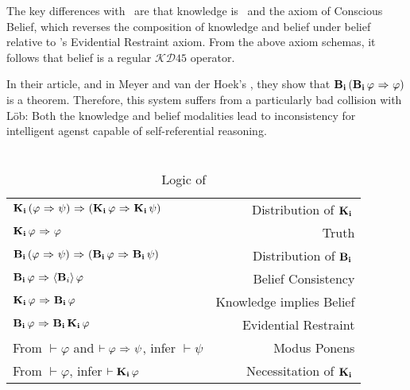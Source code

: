 The key differences with \DASL\ are that knowledge is \SFive\ and the axiom of Conscious Belief, which reverses the composition of knowledge and belief under belief relative to \DASL's Evidential Restraint axiom. From the above axiom schemas, it follows that belief is a regular $\mathcal{KD}45$ operator.

In their article, and in Meyer and van der Hoek's \cite{MeyerHoek}, they show that $\mathbf{B}_{\mathbf{i}}\,(\mathbf{B}_{\mathbf{i}}\,\varphi {\ \Rightarrow \ } \varphi)$ is a theorem. Therefore, this system suffers from a particularly bad collision with L\"ob: Both the knowledge and belief modalities lead to inconsistency for intelligent agenst capable of self-referential reasoning.
\section{\DASL}
\label{sec:crap}

\begin{table}[H]
	\begin{center}
		\begin{tabular}{| l r |}
			\hline
			$\mathbf{K}_{\mathbf{i}}\,(\varphi {\ \Rightarrow \ } \psi) {\ \Rightarrow \ } (\mathbf{K}_{\mathbf{i}}\,\varphi {\ \Rightarrow \ } \mathbf{K}_{\mathbf{i}}\,\psi)$ & Distribution of $\mathbf{K}_{\mathbf{i}}\,$ \\
			$\mathbf{K}_{\mathbf{i}}\,\varphi {\ \Rightarrow \ } \varphi$ & Truth \\
			$\mathbf{B}_{\mathbf{i}}\,(\varphi {\ \Rightarrow \ } \psi) {\ \Rightarrow \ } (\mathbf{B}_{\mathbf{i}}\,\varphi {\ \Rightarrow \ } \mathbf{B}_{\mathbf{i}}\,\psi)$ & Distribution of $\mathbf{B}_{\mathbf{i}}\,$\\
			$\mathbf{B}_{\mathbf{i}}\,\varphi {\ \Rightarrow \ } \langle \mathbf{B}_{i} \rangle\,\varphi$ & Belief Consistency \\
			$\mathbf{K}_{\mathbf{i}}\,\varphi {\ \Rightarrow \ } \mathbf{B}_{\mathbf{i}}\,\varphi$ & Knowledge implies Belief \\
			$\mathbf{B}_{\mathbf{i}}\,\varphi {\ \Rightarrow \ } \mathbf{B}_{\mathbf{i}}\,\mathbf{K}_{\mathbf{i}}\,\varphi$ & Evidential Restraint\\
			From $\vdash \varphi$ and $\vdash \varphi {\ \Rightarrow \ } \psi$, infer $\vdash\psi$ & Modus Ponens\\
			From $\vdash \varphi$, infer $\vdash \mathbf{K}_{\mathbf{i}}\,\varphi$ & Necessitation of $\mathbf{K}_{\mathbf{i}}\,$\\
			\hline
		\end{tabular}
		\caption{Logic of \DASL}~\label{GC_agent}
	\end{center}
\end{table}

